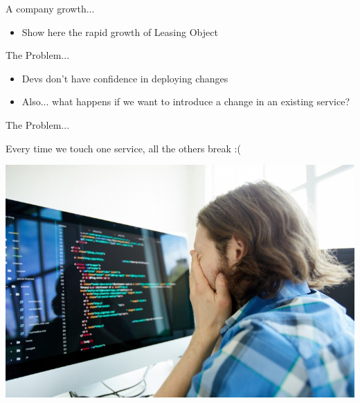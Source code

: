

\begin{frame}{A company growth...}
  \begin{itemize}
    \item Show here the rapid growth of Leasing Object
  \end{itemize}
\end{frame}

\begin{frame}{The Problem...}
  \begin{itemize}
    \item Devs don't have confidence in deploying changes
    \item Also... what happens if we want to introduce a change in an existing service?
  \end{itemize}
\end{frame}

\begin{frame}{The Problem...}
  \begin{shadequote}
    \hspace{1cm} Every time we touch one service, all the others break :(
  \end{shadequote}
  \begin{center}
    \includegraphics[scale=.3]{./assets/sad_dev.jpeg}
  \end{center}
\end{frame}


